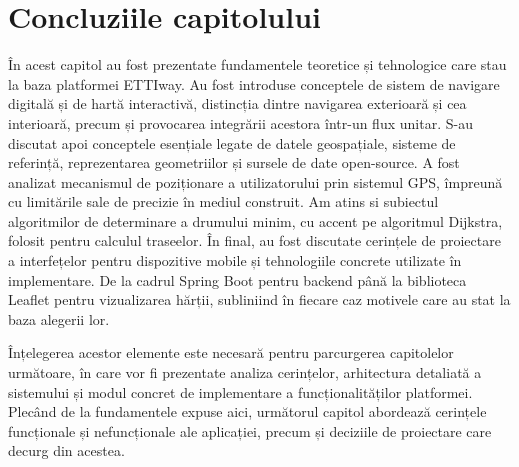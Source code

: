 \section{Concluziile capitolului}
\label{sec:concluzii-cap1}

În acest capitol au fost prezentate fundamentele teoretice și tehnologice care
stau la baza platformei ETTIway. Au fost introduse conceptele de sistem de
navigare digitală și de hartă interactivă, distincția dintre navigarea
exterioară și cea interioară, precum și provocarea integrării acestora într-un
flux unitar. S-au discutat apoi conceptele esențiale legate de datele
geospațiale, sisteme de referință, reprezentarea geometriilor și sursele de
date open-source. A fost analizat mecanismul de poziționare a utilizatorului prin
sistemul GPS, împreună cu limitările sale de precizie în mediul construit. Am atins si subiectul algoritmilor de determinare a drumului minim, cu
accent pe algoritmul Dijkstra, folosit pentru calculul traseelor. În final,
au fost discutate cerințele de proiectare a interfețelor pentru dispozitive
mobile și tehnologiile concrete utilizate în implementare. De la cadrul Spring
Boot pentru backend până la biblioteca Leaflet pentru vizualizarea hărții,
subliniind în fiecare caz motivele care au stat la baza alegerii lor.

Înțelegerea acestor elemente este necesară pentru parcurgerea capitolelor
următoare, în care vor fi prezentate analiza cerințelor, arhitectura detaliată a
sistemului și modul concret de implementare a funcționalităților platformei.
Plecând de la fundamentele expuse aici, următorul capitol abordează cerințele
funcționale și nefuncționale ale aplicației, precum și deciziile de proiectare
care decurg din acestea.
